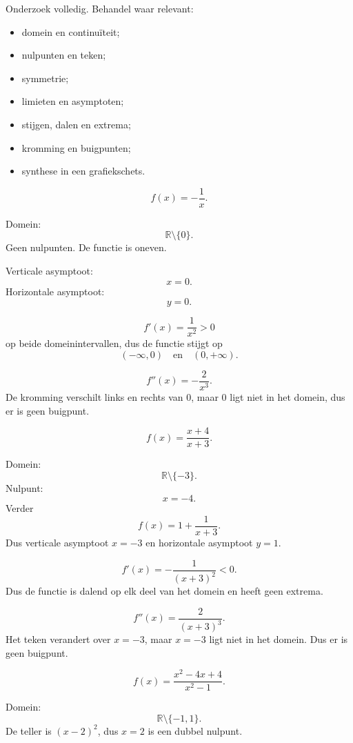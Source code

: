 \documentclass{ximera}
\begin{document}
\begin{oefening}{\oefU\ESS}
Onderzoek volledig. Behandel waar relevant:

\begin{itemize}
  \item domein en continuïteit;
  \item nulpunten en teken;
  \item symmetrie;
  \item limieten en asymptoten;
  \item stijgen, dalen en extrema;
  \item kromming en buigpunten;
  \item synthese in een grafiekschets.
\end{itemize}

\begin{question}
\[
f(x)=-\frac1x.
\]
\begin{oplossing}
Domein:
\[
\mathbb{R}\setminus\{0\}.
\]
Geen nulpunten. De functie is oneven.

Verticale asymptoot:
\[
x=0.
\]
Horizontale asymptoot:
\[
y=0.
\]

\[
f'(x)=\frac1{x^2}>0
\]
op beide domeinintervallen, dus de functie stijgt op
\[
(-\infty,0)\quad\text{en}\quad(0,+\infty).
\]

\[
f''(x)=-\frac2{x^3}.
\]
De kromming verschilt links en rechts van \(0\), maar \(0\) ligt niet
in het domein, dus er is geen buigpunt.
\end{oplossing}
\end{question}

\begin{question}
\[
f(x)=\frac{x+4}{x+3}.
\]
\begin{oplossing}
Domein:
\[
\mathbb{R}\setminus\{-3\}.
\]
Nulpunt:
\[
x=-4.
\]
Verder
\[
f(x)=1+\frac1{x+3}.
\]
Dus verticale asymptoot \(x=-3\) en horizontale asymptoot \(y=1\).

\[
f'(x)=-\frac1{(x+3)^2}<0.
\]
Dus de functie is dalend op elk deel van het domein en heeft geen extrema.

\[
f''(x)=\frac2{(x+3)^3}.
\]
Het teken verandert over \(x=-3\), maar \(x=-3\) ligt niet in het domein.
Dus er is geen buigpunt.
\end{oplossing}
\end{question}

\begin{question}
\[
f(x)=\frac{x^2-4x+4}{x^2-1}.
\]
\begin{oplossing}
Domein:
\[
\mathbb{R}\setminus\{-1,1\}.
\]
De teller is \((x-2)^2\), dus \(x=2\) is een dubbel nulpunt.


\end{oplossing}
\end{question}
\end{oefening}
\end{document}
